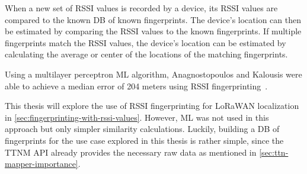 When a new set of \ac{RSSI} values is recorded by a device, its \ac{RSSI} values are compared to the known \ac{DB} of known fingerprints.
The device's location can then be estimated by comparing the \ac{RSSI} values to the known fingerprints.
If multiple fingerprints match the \ac{RSSI} values, the device's location can be estimated by calculating the average or center of the locations of the matching fingerprints.

Using a multilayer perceptron \ac{ML} algorithm, Anagnostopoulos and Kalousis were able to achieve a median error of 204 meters using \ac{RSSI} fingerprinting~\cite{anagnostopoulos_reproducible_2019}.

This thesis will explore the use of \ac{RSSI} fingerprinting for \ac{LoRaWAN} localization in \cref{sec:fingerprinting-with-rssi-values}.
However, \ac{ML} was not used in this approach but only simpler similarity calculations.
Luckily, building a \ac{DB} of fingerprints for the use case explored in this thesis is rather simple, since the \ac{TTNM} \ac{API} already provides the necessary raw data as mentioned in \cref{sec:ttn-mapper-importance}.